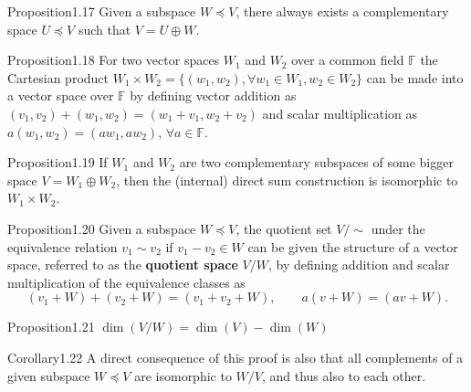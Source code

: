 \begin{res}{Proposition}{1.17}
Given a subspace $W\preccurlyeq V$, there always exists a complementary space $U\preccurlyeq V$ such that $V=U\oplus W$.
\end{res}

\begin{res}{Proposition}{1.18}
For two vector spaces $W_1$ and $W_2$ over a common field $\mathbb F$ the Cartesian product $W_1\times W_2=\{(w_1,w_2),\forall w_1\in W_1,w_2\in W_2\}$ can be made into a vector space over $\mathbb F$ by defining vector addition as $(v_1,v_2)+(w_1,w_2)=(w_1+v_1,w_2+v_2)$ and scalar multiplication as $a(w_1,w_2)=(aw_1,aw_2)$, $\forall a\in\mathbb F$.
\end{res}

\begin{res}{Proposition}{1.19}
If $W_1$ and $W_2$ are two complementary subspaces of some bigger space $V=W_1\oplus W_2$, then the (internal) direct sum construction is isomorphic to $W_1\times W_2$.
\end{res}

\begin{res}{Proposition}{1.20}
Given a subspace $W\preccurlyeq V$, the quotient set $V/\!\sim$ under the equivalence relation $v_1\sim v_2$ if $v_1-v_2\in W$ can be given the structure of a vector space, referred to as the \textbf{quotient space} $V/W$, by defining addition and scalar multiplication of the equivalence classes as
\begin{equation}(v_1+W)+(v_2+W)=(v_1+v_2+W),\qquad a(v+W)=(av+W).\tag{1.17}\end{equation}
\end{res}

\begin{res}{Proposition}{1.21}
$\dim(V/W)=\dim(V)-\dim(W)$
\end{res}

\begin{res}{Corollary}{1.22}
A direct consequence of this proof is also that all complements of a given subspace $W\preccurlyeq V$ are isomorphic to $W/V$, and thus also to each other.
\end{res}
